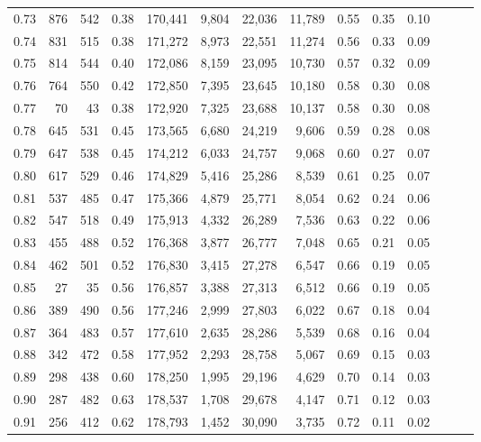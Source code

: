 \begin{tabular}{rrrrrrrrrrrrrr}
0.73 &    876 &    542 &  0.38 &  170,441 &    9,804 &  22,036 &  11,789 &  0.55 &  0.35 &      0.10 \\
0.74 &    831 &    515 &  0.38 &  171,272 &    8,973 &  22,551 &  11,274 &  0.56 &  0.33 &      0.09 \\
0.75 &    814 &    544 &  0.40 &  172,086 &    8,159 &  23,095 &  10,730 &  0.57 &  0.32 &      0.09 \\
0.76 &    764 &    550 &  0.42 &  172,850 &    7,395 &  23,645 &  10,180 &  0.58 &  0.30 &      0.08 \\
0.77 &     70 &     43 &  0.38 &  172,920 &    7,325 &  23,688 &  10,137 &  0.58 &  0.30 &      0.08 \\
0.78 &    645 &    531 &  0.45 &  173,565 &    6,680 &  24,219 &   9,606 &  0.59 &  0.28 &      0.08 \\
0.79 &    647 &    538 &  0.45 &  174,212 &    6,033 &  24,757 &   9,068 &  0.60 &  0.27 &      0.07 \\
0.80 &    617 &    529 &  0.46 &  174,829 &    5,416 &  25,286 &   8,539 &  0.61 &  0.25 &      0.07 \\
0.81 &    537 &    485 &  0.47 &  175,366 &    4,879 &  25,771 &   8,054 &  0.62 &  0.24 &      0.06 \\
0.82 &    547 &    518 &  0.49 &  175,913 &    4,332 &  26,289 &   7,536 &  0.63 &  0.22 &      0.06 \\
0.83 &    455 &    488 &  0.52 &  176,368 &    3,877 &  26,777 &   7,048 &  0.65 &  0.21 &      0.05 \\
0.84 &    462 &    501 &  0.52 &  176,830 &    3,415 &  27,278 &   6,547 &  0.66 &  0.19 &      0.05 \\
0.85 &     27 &     35 &  0.56 &  176,857 &    3,388 &  27,313 &   6,512 &  0.66 &  0.19 &      0.05 \\
0.86 &    389 &    490 &  0.56 &  177,246 &    2,999 &  27,803 &   6,022 &  0.67 &  0.18 &      0.04 \\
0.87 &    364 &    483 &  0.57 &  177,610 &    2,635 &  28,286 &   5,539 &  0.68 &  0.16 &      0.04 \\
0.88 &    342 &    472 &  0.58 &  177,952 &    2,293 &  28,758 &   5,067 &  0.69 &  0.15 &      0.03 \\
0.89 &    298 &    438 &  0.60 &  178,250 &    1,995 &  29,196 &   4,629 &  0.70 &  0.14 &      0.03 \\
0.90 &    287 &    482 &  0.63 &  178,537 &    1,708 &  29,678 &   4,147 &  0.71 &  0.12 &      0.03 \\
0.91 &    256 &    412 &  0.62 &  178,793 &    1,452 &  30,090 &   3,735 &  0.72 &  0.11 &      0.02 \\

\end{tabular}
